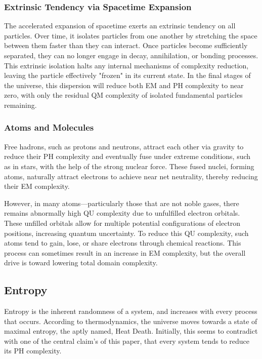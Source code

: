 \documentclass{article}
\begin{document}
\subsubsection{Extrinsic Tendency via Spacetime Expansion}
The accelerated expansion of spacetime exerts an extrinsic tendency on all particles. Over time, it isolates particles from one another by stretching the space between them faster than they can interact. Once particles become sufficiently separated, they can no longer engage in decay, annihilation, or bonding processes. This extrinsic isolation halts any internal mechanisms of complexity reduction, leaving the particle effectively "frozen" in its current state. In the final stages of the universe, this dispersion will reduce both EM and PH complexity to near zero, with only the residual QM complexity of isolated fundamental particles remaining.

\subsubsection{Atoms and Molecules}
Free hadrons, such as protons and neutrons, attract each other via gravity to reduce their PH complexity and eventually fuse under extreme conditions, such as in stars, with the help of the strong nuclear force. These fused nuclei, forming atoms, naturally attract electrons to achieve near net neutrality, thereby reducing their EM complexity.

However, in many atoms—particularly those that are not noble gases, there remains abnormally high QU complexity due to unfulfilled electron orbitals. These unfilled orbitals allow for multiple potential configurations of electron positions, increasing quantum uncertainty. To reduce this QU complexity, such atoms tend to gain, lose, or share electrons through chemical reactions. This process can sometimes result in an increase in EM complexity, but the overall drive is toward lowering total domain complexity.



\subsection{Entropy}
Entropy is the inherent randomness of a system, and increases with every process that occurs. According to thermodynamics, the universe moves towards a state of maximal entropy, the aptly named, Heat Death. Initially, this seems to contradict with one of the central claim's of this paper, that every system tends to reduce its PH complexity.
\end{document}
